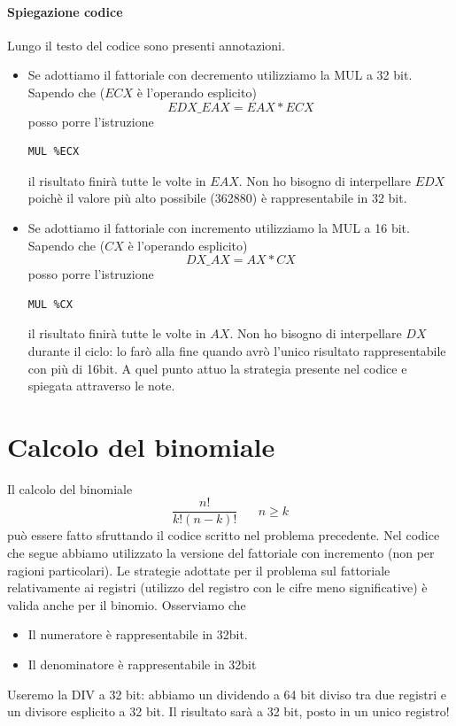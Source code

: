 \documentclass[11pt]{report}
\begin{document}
\paragraph{Spiegazione codice} Lungo il testo del codice sono presenti annotazioni.
\begin{itemize}
\item Se adottiamo il fattoriale con decremento utilizziamo la MUL a 32 bit. Sapendo che ($ECX$ è l'operando esplicito)
\[EDX\_EAX=EAX*ECX\]
posso porre l'istruzione 
\begin{verbatim}
MUL %ECX
\end{verbatim}
il risultato finirà tutte le volte in $EAX$. Non ho bisogno di interpellare $EDX$ poichè il valore più alto possibile (362880) è rappresentabile in 32 bit.
\item Se adottiamo il fattoriale con incremento utilizziamo la MUL a 16 bit. Sapendo che ($CX$ è l'operando esplicito)
\[DX\_AX=AX*CX\]
posso porre l'istruzione 
\begin{verbatim}
MUL %CX
\end{verbatim}
il risultato finirà tutte le volte in $AX$. Non ho bisogno di interpellare $DX$ durante il ciclo: lo farò alla fine quando avrò l'unico risultato rappresentabile con più di 16bit. A quel punto attuo la strategia presente nel codice e spiegata attraverso le note.
\end{itemize}

\section{Calcolo del binomiale}
Il calcolo del binomiale
\[\frac{n!}{k!(n-k)!}\;\;\;\;\;\;n \geq k\]
può essere fatto sfruttando il codice scritto nel problema precedente. Nel codice che segue abbiamo utilizzato la versione del fattoriale con incremento (non per ragioni particolari). Le strategie adottate per il problema sul fattoriale relativamente ai registri (utilizzo del registro con le cifre meno significative) è valida anche per il binomio. Osserviamo che
\begin{itemize}
\item Il numeratore è rappresentabile in 32bit.
\item Il denominatore è rappresentabile in 32bit
\end{itemize}
Useremo la DIV a 32 bit: abbiamo un dividendo a 64 bit diviso tra due registri e un divisore esplicito a 32 bit. Il risultato sarà a 32 bit, posto in un unico registro!

\end{document}
